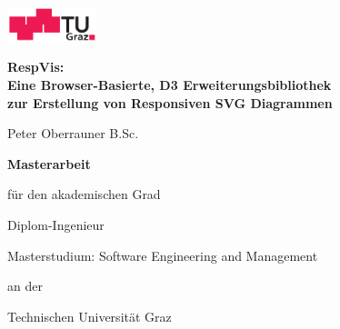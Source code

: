 \begin{otherlanguage}{austrian}

    \vspace*{-3cm}

    \begin{center}
        \includegraphics[height=1cm]{diagrams/tugraz-logo.pdf}

        \vspace{2cm}

        \begin{spacing}{1.1}
            \huge\sffamily\bfseries
            RespVis:\\
            Eine Browser-Basierte, D3 Erweiterungsbibliothek\\
            zur Erstellung von Responsiven SVG Diagrammen
        \end{spacing}

        \vspace{2cm}

        {\Large\sffamily Peter Oberrauner B.Sc.}

        \vspace{2cm}

        {\Large\sffamily\bfseries Masterarbeit}

        \vspace{5mm}

        {\small\sffamily für den akademischen Grad}

        \vspace{5mm}

        {\normalsize\sffamily Diplom-Ingenieur}

        \vspace{5mm}

        {\normalsize\sffamily
            Masterstudium: Software Engineering and Management
        }


        \vspace{1cm}

        {\small\sffamily an der}

        \vspace{5mm}

        {\large\sffamily Technischen Universität Graz}



        \vspace{1cm}


\end{center}
\end{otherlanguage}
